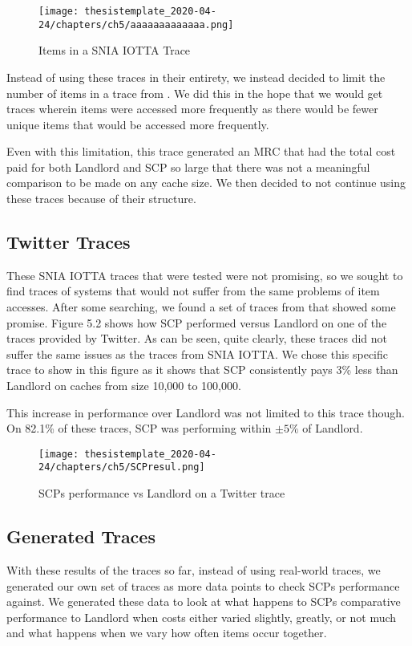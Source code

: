 \begin{figure}[h]
    \centering
        \texttt{[image: thesistemplate\_2020-04-24/chapters/ch5/aaaaaaaaaaaaa.png]}
    \caption{Items in a SNIA IOTTA Trace}
    \label{fig:my_label}
\end{figure}


Instead of using these traces in their entirety, we instead decided to limit the number of items in a trace from \cite{snia-trace-block-io-28571}. We did this in the hope that we would get traces wherein items were accessed more frequently as there would be fewer unique items that would be accessed more frequently.

Even with this limitation, this trace generated an MRC that had the total cost paid for both Landlord and SCP so large that there was not a meaningful comparison to be made on any cache size. We then decided to not continue using these traces because of their structure. 



\subsection{Twitter Traces}
These SNIA IOTTA traces that were tested were not promising, so we sought to find traces of systems that would not suffer from the same problems of item accesses. After some searching, we found a set of traces from \cite{cacheWorkload-OSDI20} that showed some promise. Figure 5.2 shows how SCP performed versus Landlord on one of the traces provided by Twitter. As can be seen, quite clearly, these traces did not suffer the same issues as the traces from SNIA IOTTA. We chose this specific trace to show in this figure as it shows that SCP consistently pays 3\% less than Landlord on caches from size 10,000 to 100,000.


This increase in performance over Landlord was not limited to this trace though. On 82.1\% of these traces, SCP was performing within $\pm 5\%$ of Landlord. 

\begin{figure}[h]
  \begin{center}
    \texttt{[image: thesistemplate\_2020-04-24/chapters/ch5/SCPresul.png]}
  \end{center}
  \caption{SCPs performance vs Landlord on a Twitter trace}
\end{figure}


\subsection{Generated Traces}
With these results of the traces so far, instead of using real-world traces, we generated our own set of traces as more data points to check SCPs performance against. We generated these data to look at what happens to SCPs comparative performance to Landlord when costs either varied slightly, greatly, or not much and what happens when we vary how often items occur together.


